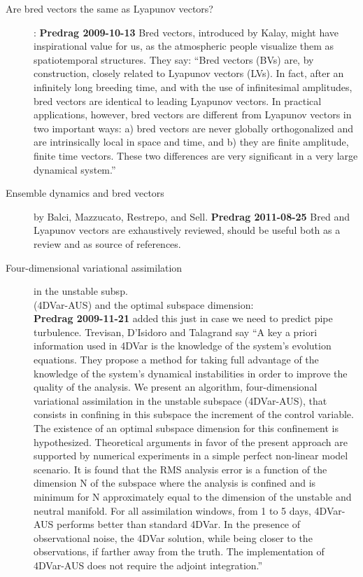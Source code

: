 \begin{description}
\item[Are bred vectors the same as
    {L}yapunov vectors?]: {\bf Predrag
2009-10-13} Bred vectors, introduced by Kalay, might have
inspirational value for us, as the atmospheric people
visualize them as spatiotemporal structures. They say:
    ``Bred vectors (BVs) are, by construction, closely
related to Lyapunov vectors (LVs). In fact, after an
infinitely long breeding time, and with the use of
infinitesimal amplitudes, bred vectors are identical to
leading Lyapunov vectors. In practical applications,
however, bred vectors are different from Lyapunov
vectors in two important ways: a) bred vectors are
never globally orthogonalized and are intrinsically
local in space and time, and b) they are finite
amplitude, finite time vectors. These two differences
are very significant in a very large dynamical system.''

\item[Ensemble dynamics and bred vectors]
by Balci, {Mazzucato}, {Restrepo}, and Sell.
{\bf Predrag 2011-08-25} Bred and Lyapunov vectors are
exhaustively reviewed, should be useful both as a review
and as source of references.

\item[Four-dimensional variational assimilation]
	{in the unstable subsp. \\
      (4DVar-AUS) and the optimal subspace dimension}:
	\\
{\bf Predrag
2009-11-21} added this just in case we need to predict pipe turbulence.
Trevisan, D'Isidoro and Talagrand say
``A key a priori information used in 4DVar is the knowledge of the
system's evolution equations. They propose a method for taking full
advantage of the knowledge of the system's dynamical instabilities in
order to improve the quality of the analysis. We present an
algorithm, four-dimensional variational assimilation in the unstable
subspace (4DVar-AUS), that consists in confining in this subspace the
increment of the control variable. The existence of an optimal
subspace dimension for this confinement is hypothesized. Theoretical
arguments in favor of the present approach are supported by numerical
experiments in a simple perfect non-linear model scenario. It is
found that the RMS analysis error is a function of the dimension N of
the subspace where the analysis is confined and is minimum for N
approximately equal to the dimension of the unstable and neutral
manifold. For all assimilation windows, from 1 to 5 days, 4DVar-AUS
performs better than standard 4DVar. In the presence of observational
noise, the 4DVar solution, while being closer to the observations, if
farther away from the truth. The implementation of 4DVar-AUS does not
require the adjoint integration.''


\end{description}
